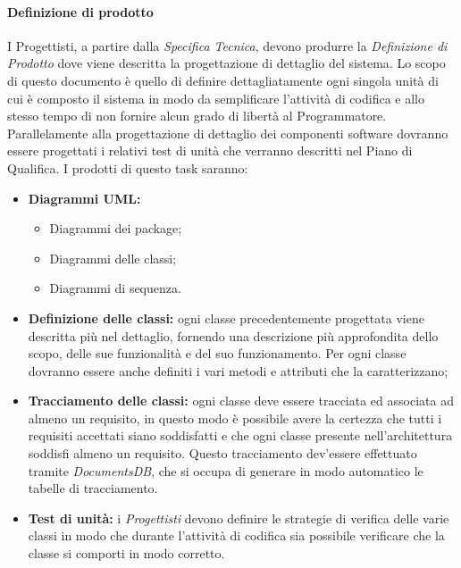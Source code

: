 \paragraph{Definizione di prodotto}
I Progettisti, a partire dalla \textit{Specifica Tecnica}, devono produrre la \textit{Definizione di Prodotto} dove viene descritta la progettazione di dettaglio del sistema.
Lo scopo di questo documento è quello di definire dettagliatamente ogni singola unità
di cui è composto il sistema in modo da semplificare l’attività di codifica e allo stesso
tempo di non fornire alcun grado di libertà al Programmatore.
Parallelamente alla progettazione di dettaglio dei componenti software dovranno essere
progettati i relativi test di unità che verranno descritti nel Piano di Qualifica.
I prodotti di questo task saranno:
\begin{itemize}
	\item \textbf{Diagrammi UML:}
	\begin{itemize}
		\item Diagrammi dei package;
		\item Diagrammi delle classi;
		\item Diagrammi di sequenza.
	\end{itemize}
	\item \textbf{Definizione delle classi:} ogni classe precedentemente progettata viene descritta più nel dettaglio, fornendo una descrizione più approfondita dello scopo, delle sue funzionalità e del suo funzionamento. Per ogni classe dovranno essere anche definiti i vari metodi e attributi che la caratterizzano;
	\item \textbf{Tracciamento delle classi:} ogni classe deve essere tracciata ed associata ad almeno un requisito, in questo modo è possibile avere la certezza che tutti i requisiti accettati siano soddisfatti e che ogni classe presente nell'architettura soddisfi almeno un requisito. Questo tracciamento dev'essere effettuato tramite \textit{DocumentsDB}, che si occupa di generare in modo automatico le tabelle di tracciamento.
	\item \textbf{Test di unità:} i \textit{Progettisti} devono definire le strategie di verifica delle varie classi in modo che durante l'attività di codifica sia possibile verificare che la classe si comporti in modo corretto.
\end{itemize}

